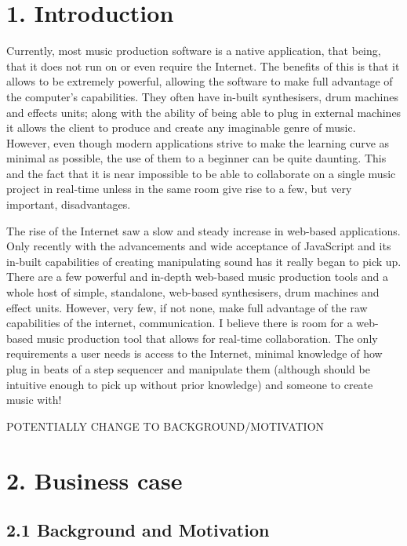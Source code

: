 \documentclass[a4paper]{article}
\begin{document}
\tableofcontents

\newpage

\justify

\section{1. Introduction}

Currently, most music production software is a native application, that being, that it does not run on or even require the Internet. The benefits of this is that it allows to be extremely powerful, allowing the software to make full advantage of the computer's capabilities. They often have in-built synthesisers, drum machines and effects units; along with the ability of being able to plug in external machines it allows the client to produce and create any imaginable genre of music. However, even though modern applications strive to make the learning curve as minimal as possible, the use of them to a beginner can be quite daunting. This and the fact that it is near impossible to be able to collaborate on a single music project in real-time unless in the same room give rise to a few, but very important, disadvantages. \par

The rise of the Internet saw a slow and steady increase in web-based applications. Only recently with the advancements and wide acceptance of JavaScript and its in-built capabilities of creating manipulating sound has it really began to pick up. There are a few powerful and in-depth web-based music production tools and a whole host of simple, standalone, web-based synthesisers, drum machines and effect units. However, very few, if not none, make full advantage of the raw capabilities of the internet, communication. I believe there is room for a web-based music production tool that allows for real-time collaboration. The only requirements a user needs is access to the Internet, minimal knowledge of how plug in beats of a step sequencer and manipulate them (although should be intuitive enough to pick up without prior knowledge) and someone to create music with!

POTENTIALLY CHANGE TO BACKGROUND/MOTIVATION
\section{2. Business case}

\subsection{2.1 Background and Motivation}
\end{document}
